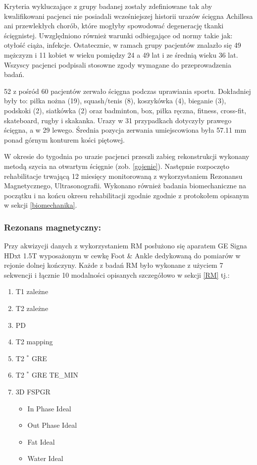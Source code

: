 Kryteria wykluczające z grupy badanej zostały zdefiniowane tak aby kwalifikowani pacjenci nie posiadali wcześniejszej historii urazów ścięgna Achillesa ani przewlekłych chorób, które mogłyby spowodować degenerację tkanki ścięgnistej. Uwzględniono również warunki odbiegające od normy takie jak: otyłość ciąża, infekcje. Ostatecznie, w ramach grupy pacjentów znalazło się 49 mężczyzn i 11 kobiet w wieku pomiędzy 24 a 49 lat i ze średnią wieku 36 lat. Wszyscy pacjenci podpisali stosowne zgody wymagane do przeprowadzenia badań.   

52 z pośród 60 pacjentów zerwało ścięgna podczas uprawiania sportu. Dokładniej były to: piłka nożna (19), squash/tenis (8), koszykówka (4), bieganie (3), podskoki (2), siatkówka (2) oraz badminton, box, piłka ręczna, fitness, cross-fit, skateboard, rugby i skakanka. Urazy w 31 przypadkach dotyczyły prawego ścięgna, a w 29 lewego. Średnia pozycja zerwania umiejscowiona była 57.11 mm ponad górnym konturem kości piętowej.

W okresie do tygodnia po urazie pacjenci przeszli zabieg rekonstrukcji wykonany metodą szycia na otwartym ścięgnie (zob. \ref{gojenie}). Następnie rozpoczęto rehabilitacje trwającą 12 miesięcy monitorowaną z wykorzystaniem Rezonansu Magnetycznego, Ultrasonografii. Wykonano również badania biomechaniczne na początku i na końcu okresu rehabilitacji zgodnie zgodnie z protokołem opisanym w sekcji \ref{biomechanika}.

\subsubsection{Rezonans magnetyczny:}
Przy akwizycji danych z wykorzystaniem RM posłużono się aparatem GE Signa HDxt 1.5T wyposażonym w cewkę Foot \& Ankle dedykowaną do pomiarów w rejonie dolnej kończyny. Każde z badań RM było wykonane z użyciem 7 sekwencji i łącznie 10 modalności opisanych szczegółowo w sekcji \ref{RM} tj.:
\begin{enumerate}
	\item T1 zależne
	\item T2 zależne
	\item PD
	\item T2 mapping
	\item T2 $^\ast$ GRE
	\item T2 $^\ast$ GRE TE\_MIN
	\item 3D FSPGR
	\begin{itemize}
		\item In Phase Ideal
		\item Out Phase Ideal
		\item Fat Ideal
		\item Water Ideal 
	\end{itemize}
\end{enumerate}

